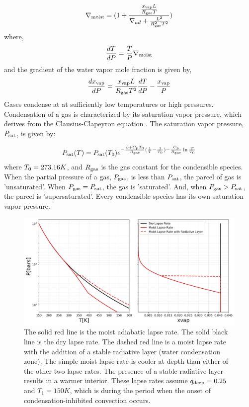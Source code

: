 \documentclass[11pt]{ucscthesisbs}
\begin{document}
\begin{equation}
\nabla_{\rm moist} = (1 + \frac{\frac{x_{\rm vap} L}{R_{\rm gas}T}}{\nabla_{ad} + \frac{L^2}{R_{\rm gas}^2 T^2}} )
\end{equation}
where,
\begin{equation}
\frac{dT}{dP} =\frac{T}{P}\nabla_{\rm moist}
\end{equation}
and the gradient of the water vapor mole fraction \citep{robinson_2016} is given by,
\begin{equation}
\frac{d x_{\rm vap}}{dP} = \frac{x_{\rm vap} L}{R_{\rm gas} T^2} \frac{dT}{dP} - \frac{x_{\rm vap}}{P}
\end{equation}
Gases condense at at sufficiently low temperatures or high pressures. Condensation of a gas is characterized by its saturation vapor pressure, which derives from the Clausius-Clapeyron equation \citep{sanchez_2011}. The saturation vapor pressure, $P_{\rm sat}$, is given by: 

\begin{equation}
  P_{\rm sat}(T) = P_{\rm sat}(T_{\rm 0})e^{-\frac{L + C_{\rm p}T_{\rm 0}}{R_{\rm gas}}(\frac{1}{T} - \frac{1}{T_{\rm 0}}) -\frac{C_{\rm p}}{R_{\rm gas}}\ln{\frac{T}{T_{\rm 0}}}}
  \label{eq:saturation_vapor_pressure}
\end{equation}
where $T_{\rm 0} = 273.16K$, and $R_{\rm gas}$ is the gas constant for the condensible species. When the partial pressure of a gas, $P_{\rm gas}$, is less than $P_{\rm sat}$, the parcel of gas is 'unsaturated'. When $P_{\rm gas} = P_{\rm sat}$, the gas is 'saturated'. And, when $P_{\rm gas} > P_{\rm sat}$, the parcel is 'supersaturated'. Every condensible species has its own saturation vapor pressure. 

\begin{figure}[ht!]
 \centerline{
  \includegraphics[width=6.5in]{figures/comparison_dry_vs_moist_lapse_rates.png}
 }
\caption[A Standard Interior Structure Model]
{The solid red line is the moist adiabatic lapse rate. The solid black line is the dry lapse rate. The dashed red line is a moist lapse rate with the addition of a stable radiative layer (water condensation zone). The simple moist lapse rate is cooler at depth than either of the other two lapse rates. The presence of a stable radiative layer results in a warmer interior. These lapse rates assume $q_{\rm deep} = 0.25$ and $T_{1} = 150K$, which is during the period when the onset of condensation-inhibited convection occurs.}
\label{fig:standard_dry_interior}
\end{figure}
\end{document}
